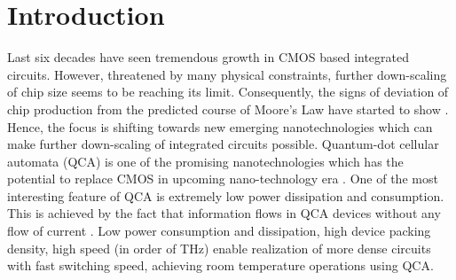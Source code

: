 \documentclass[conference]{IEEEtran}
\begin{document}
%
%
%
%

\section{Introduction}
\label{sec:intro}
Last six decades have seen tremendous growth in CMOS based integrated circuits.
However, threatened by many physical constraints, further down-scaling of chip size seems to be reaching its limit.
Consequently, the signs of deviation of chip production from the predicted course of Moore's Law have started to show \cite{end_of_MooresLaw}.
Hence, the focus is shifting towards new emerging nanotechnologies which can make further down-scaling of integrated circuits possible.
Quantum-dot cellular automata (QCA) is one of the promising nanotechnologies which has the potential to replace CMOS in upcoming nano-technology era \cite{lent_tnano1993}.
One of the most interesting feature of QCA is extremely low power dissipation and consumption. This is achieved by the fact that information flows in QCA devices without any flow of current \cite{lent_tnano1993}.
Low power consumption and dissipation, high device packing density, high speed (in order of THz) enable realization of more dense circuits with fast switching speed, achieving room temperature operations \cite{Isakcs_2003,burn_sc2000,wang_ieee2004} using QCA.
\end{document}
